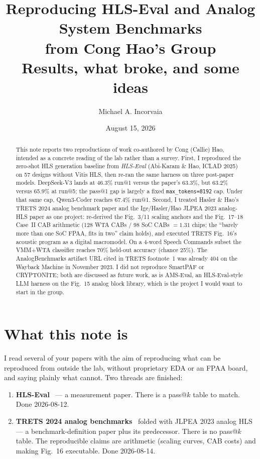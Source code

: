 \documentclass[11pt]{article}
\title{\textbf{Reproducing HLS-Eval and Analog System Benchmarks\\
from Cong Hao's Group}\\[0.4em]
\large Results, what broke, and some ideas}
\author{Michael A. Incorvaia}
\date{August 15, 2026}
\newcommand{\code}[1]{\texttt{#1}}
\begin{document}
\maketitle

\begin{abstract}
This note reports two reproductions of work co-authored by Cong (Callie)
Hao, intended as a concrete reading of the lab rather than a survey.
First, I reproduced the zero-shot HLS generation baseline from
\emph{HLS-Eval} (Abi-Karam \& Hao, ICLAD 2025) on 57 designs without
Vitis HLS, then re-ran the same harness on three post-paper models.
DeepSeek-V3 lands at 46.3\% run@1 versus the paper's 63.3\%, but
63.2\% versus 65.9\% at run@5; the pass@1 gap is largely a fixed
\code{max\_tokens=8192} cap. Under that same cap, Qwen3-Coder reaches
67.4\% run@1. Second, I treated Hasler \& Hao's TRETS 2024 analog
benchmark paper and the Ige/Hasler/Hao JLPEA 2023 analog-HLS paper as
one project: re-derived the Fig.~3/11 scaling anchors and the Fig.~17--18
Case~II CAB arithmetic (128 WTA CABs / 98 SoC CABs $= 1.31$ chips;
the ``barely more than one SoC FPAA, fits in two'' claim holds), and
executed TRETS Fig.~16's acoustic program as a digital macromodel.
On a 4-word Speech Commands subset the VMM+WTA classifier reaches 70\%
held-out accuracy (chance 25\%). The AnalogBenchmarks artifact URL cited
in TRETS footnote~1 was already 404 on the Wayback Machine in November
2023. I did not reproduce SmartPAF or CRYPTONITE; both are discussed as
future work, as is AMS-Eval, an HLS-Eval-style LLM harness on the
Fig.~15 analog block library, which is the project I would want to start
in the group.
\end{abstract}

\tableofcontents
\vspace{0.8em}

\section{What this note is}

I read several of your papers with the aim of reproducing what can be
reproduced from outside the lab, without proprietary EDA or an FPAA
board, and saying plainly what cannot. Two threads are finished:

\begin{enumerate}
\item \textbf{HLS-Eval}~\cite{hlseval} --- a measurement paper. There is
a pass@$k$ table to match. Done 2026-08-12.
\item \textbf{TRETS 2024 analog benchmarks}~\cite{trets} folded with
JLPEA 2023 analog HLS~\cite{jlpea} --- a benchmark-definition
paper plus its predecessor. There is no pass@$k$ table. The reproducible
claims are arithmetic (scaling curves, CAB costs) and making Fig.~16
executable. Done 2026-08-14.
\end{enumerate}
\end{document}
